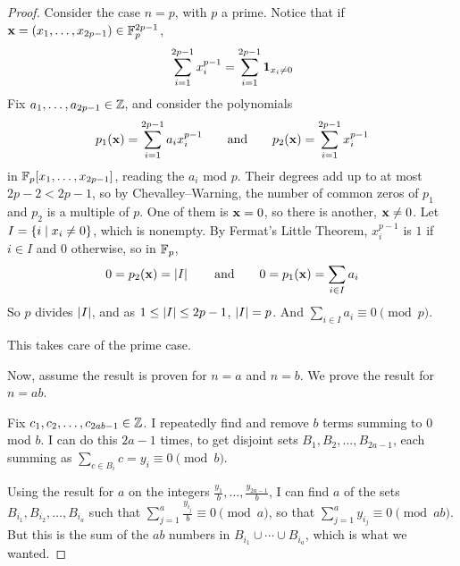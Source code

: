 \begin{proof}
    Consider the case $n = p$, with $p$ a prime. Notice that if $\mathbf{x} = \left( x_1, \ldots, x_{2p - 1} \right) \in \mathbb{F}_p^{2p - 1}$,
    \begin{align*}
        \sum_{i=1}^{2p - 1} x_i^{p - 1} = \sum_{i=1}^{2p - 1} \mathbf{1}_{x_i \neq 0}
    \end{align*}
    Fix $a_1, \ldots, a_{2p - 1} \in \mathbb{Z}$, and consider the polynomials
    \begin{align*}
        p_1\!\left( \mathbf{x} \right) = \sum_{i=1}^{2p - 1} a_i x_i^{p - 1} \qquad \text{and} \qquad p_2\!\left( \mathbf{x} \right) = \sum_{i=1}^{2p - 1} x_i^{p - 1}
    \end{align*}
    in $\mathbb{F}_p\!\left[ x_1, \ldots, x_{2p - 1} \right]$, reading the $a_i$ mod $p$. Their degrees add up to at most $2p - 2 < 2p - 1$, so by Chevalley--Warning, the number of common zeros of $p_1$ and $p_2$ is a multiple of $p$. One of them is $\mathbf{x} = 0$, so there is another, $\mathbf{x} \neq 0$. Let $I = \left\{ i \; \middle\vert \; x_i \neq 0 \right\}$, which is nonempty. By Fermat's Little Theorem, $x_i^{p - 1}$ is $1$ if $i \in I$ and $0$ otherwise, so in $\mathbb{F}_p$,
    \begin{align*}
        0 = p_2\!\left( \mathbf{x} \right) = \left\lvert I \right\rvert \qquad \text{and} \qquad 0 = p_1\!\left( \mathbf{x} \right) = \sum_{i \in I} a_i
    \end{align*}
    So $p$ divides $\left\lvert I \right\rvert$, and as $1 \leq \left\lvert I \right\rvert \leq 2p - 1$, $\left\lvert I \right\rvert = p$. And $\sum_{i \in I} a_i \equiv 0 \pmod{p}$.

    This takes care of the prime case.

    Now, assume the result is proven for $n = a$ and $n = b$. We prove the result for $n = ab$.

    Fix $c_1, c_2, \ldots, c_{2ab - 1} \in \mathbb{Z}$. I repeatedly find and remove $b$ terms summing to $0$ mod $b$. I can do this $2a - 1$ times, to get disjoint sets $B_1, B_2, \ldots, B_{2a - 1}$, each summing as $\sum_{c \in B_i} c = y_i \equiv 0 \pmod{b}$.

    Using the result for $a$ on the integers $\frac{y_1}{b}, \ldots, \frac{y_{2a - 1}}{b}$, I can find $a$ of the sets $B_{i_1}, B_{i_2}, \ldots, B_{i_a}$ such that $\sum_{j=1}^{a} \frac{y_{i_j}}{b} \equiv 0 \pmod{a}$, so that $\sum_{j=1}^{a} y_{i_j} \equiv 0 \pmod{ab}$. But this is the sum of the $ab$ numbers in $B_{i_1} \cup \cdots \cup B_{i_a}$, which is what we wanted.
\end{proof}
